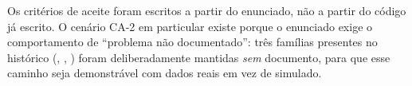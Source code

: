 \begin{decisao}
Os critérios de aceite foram escritos a partir do enunciado, não a partir do
código já escrito. O cenário CA-2 em particular existe porque o enunciado exige
o comportamento de \enquote{problema não documentado}: três famílias presentes
no histórico (, , ) foram
deliberadamente mantidas \emph{sem} documento, para que esse caminho seja
demonstrável com dados reais em vez de simulado.
\end{decisao}
